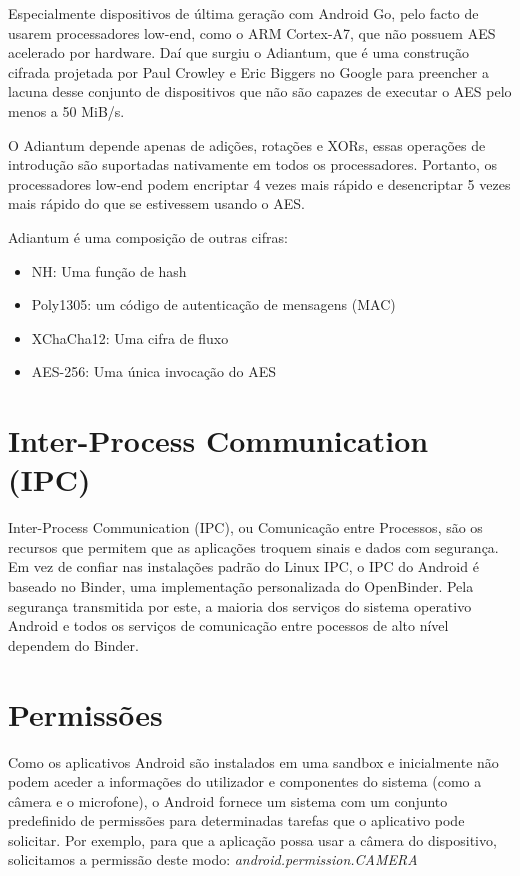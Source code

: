 \documentclass{article}
\begin{document}
\par Especialmente dispositivos de última geração com Android Go, pelo facto de usarem processadores low-end, como o ARM Cortex-A7, que não possuem AES acelerado por hardware.
Daí que surgiu o Adiantum, que é uma construção cifrada projetada por Paul Crowley e Eric Biggers no Google para preencher a lacuna desse conjunto de dispositivos que não são capazes de executar o AES pelo menos a 50 MiB/s. 
\par O Adiantum depende apenas de adições, rotações e XORs, essas operações de introdução são suportadas nativamente em todos os processadores. Portanto, os processadores low-end podem encriptar 4 vezes mais rápido e desencriptar 5 vezes mais rápido do que se estivessem usando o AES.
\\
\par Adiantum é uma composição de outras cifras:
\begin{itemize}
    \item NH: Uma função de hash
    \item Poly1305: um código de autenticação de mensagens (MAC)
    \item XChaCha12: Uma cifra de fluxo
    \item AES-256: Uma única invocação do AES
\end{itemize}

\section{Inter-Process Communication (IPC)}
Inter-Process Communication (IPC), ou Comunicação entre Processos, são os recursos que permitem que as aplicações troquem sinais e dados com segurança. Em vez de confiar nas instalações padrão do Linux IPC, o IPC do Android é baseado no Binder, uma implementação personalizada do OpenBinder. Pela segurança transmitida por este, a maioria dos serviços do sistema operativo Android e todos os serviços de comunicação entre pocessos de alto nível dependem do Binder.




\section{Permissões}
Como os aplicativos Android são instalados em uma sandbox e inicialmente não podem aceder a informações do utilizador e componentes do sistema (como a câmera e o microfone), o Android fornece um sistema com um conjunto predefinido de permissões para determinadas tarefas que o aplicativo pode solicitar. 
Por exemplo, para que a aplicação possa usar a câmera do dispositivo, solicitamos a permissão deste modo: \textit{android.permission.CAMERA}
\end{document}
